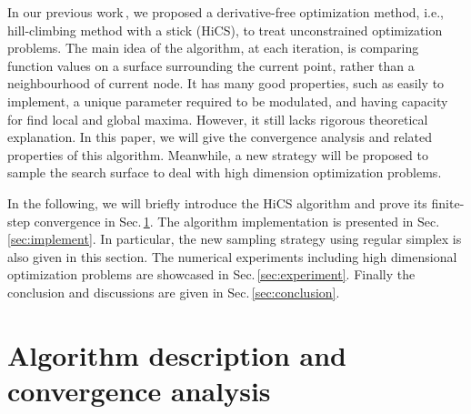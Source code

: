 \documentclass[final,1p,times]{elsarticle}
\begin{document}
In our previous work\,\cite{huang2017hill}, we proposed a
derivative-free optimization method, i.e., hill-climbing method
with a stick (HiCS), to treat unconstrained optimization problems. 
The main idea of the algorithm, at each iteration, is
comparing function values on a surface surrounding the current point,
rather than a neighbourhood of current node. 
It has many good properties, such as easily to implement,
a unique parameter required to be modulated, and having capacity
for find local and global maxima. However, it still lacks rigorous
theoretical explanation. 
In this paper, we will give the convergence analysis and related
properties of this algorithm. 
Meanwhile, a new strategy will be proposed to sample the search
surface to deal with high dimension optimization problems.

In the following, we will briefly introduce the HiCS algorithm and
prove its finite-step convergence in Sec.\,\ref{sec:algorithm}. 
The algorithm implementation is presented in Sec.\,\ref{sec:implement}.
In particular, the new sampling strategy using regular simplex is
also given in this section.
The numerical experiments including high dimensional optimization
problems are showcased in Sec.\,\ref{sec:experiment}. 
Finally the conclusion and discussions are given in Sec.\,\ref{sec:conclusion}.



\section{Algorithm description and convergence analysis}
\label{sec:algorithm}
\end{document}
